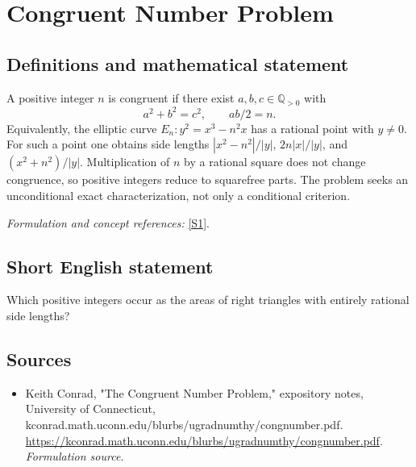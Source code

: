 \documentclass[11pt]{article}
\begin{document}
\section*{\texorpdfstring{Congruent Number Problem}{Congruent Number Problem}}\label{146}
\subsection{Definitions and mathematical statement}
A positive integer $n$ is congruent if there exist $a,b,c\in{\mathbb{Q}}_{>0}$ with
\[
 a^2+b^2=c^2,\qquad ab/2=n.
\]
Equivalently, the elliptic curve $E_n:y^2=x^3-n^2x$ has a rational point with $y\ne0$. For such a point one obtains side lengths $|x^2-n^2|/|y|$, $2n|x|/|y|$, and $(x^2+n^2)/|y|$. Multiplication of $n$ by a rational square does not change congruence, so positive integers reduce to squarefree parts. The problem seeks an unconditional exact characterization, not only a conditional criterion.
\par\smallskip\textit{Formulation and concept references:} \href{https://kconrad.math.uconn.edu/blurbs/ugradnumthy/congnumber.pdf}{[S1]}.

\subsection{Short English statement}
Which positive integers occur as the areas of right triangles with entirely rational side lengths?
\subsection{Sources}
\begin{itemize}
\item[S1]Keith Conrad, "The Congruent Number Problem," expository notes, University of Connecticut, kconrad.math.uconn.edu/blurbs/ugradnumthy/congnumber.pdf.
\url{https://kconrad.math.uconn.edu/blurbs/ugradnumthy/congnumber.pdf}.
\textit{Formulation source.}
\end{itemize}
\end{document}
